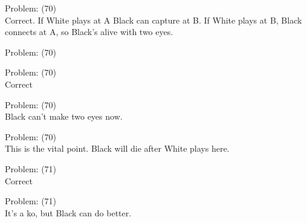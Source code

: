 \documentclass[11pt]{article}
\begin{document}
\begin{minipage}[t]{0.5\textwidth}
  {\centering
  
  Problem: (70)\\
  Correct. If White plays at A Black can capture at B. If White plays at B, Black connects at A, so Black's alive with two eyes.\\
  }
\end{minipage}
\begin{minipage}[t]{0.5\textwidth}
  {\centering
  
  Problem: (70)\\
  
  }
\end{minipage}
\begin{minipage}[t]{0.5\textwidth}
  {\centering
  
  Problem: (70)\\
  Correct\\
  }
\end{minipage}
\begin{minipage}[t]{0.5\textwidth}
  {\centering
  
  Problem: (70)\\
  Black can't make two eyes now.\\
  }
\end{minipage}
\begin{minipage}[t]{0.5\textwidth}
  {\centering
  
  Problem: (70)\\
  This is the vital point. Black will die after White plays here.\\
  }
\end{minipage}
\begin{minipage}[t]{0.5\textwidth}
  {\centering
  
  Problem: (71)\\
  Correct\\
  }
\end{minipage}
\begin{minipage}[t]{0.5\textwidth}
  {\centering
  
  Problem: (71)\\
  It's a ko, but Black can do better.\\
  }
\end{minipage}
\end{document}
